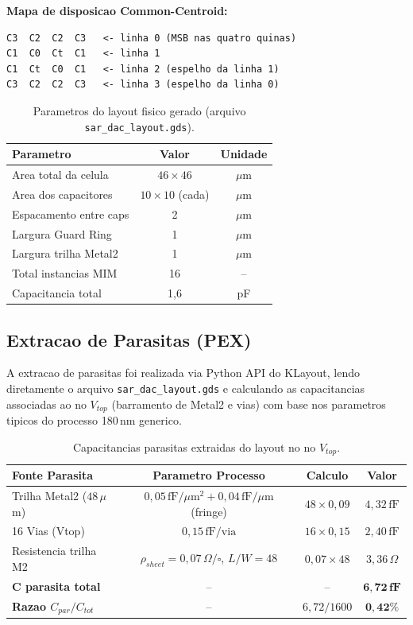 \documentclass[12pt, a4paper]{article}
\begin{document}
\textbf{Mapa de disposicao Common-Centroid:}
\begin{lstlisting}
C3  C2  C2  C3   <- linha 0 (MSB nas quatro quinas)
C1  C0  Ct  C1   <- linha 1
C1  Ct  C0  C1   <- linha 2 (espelho da linha 1)
C3  C2  C2  C3   <- linha 3 (espelho da linha 0)
\end{lstlisting}

\begin{table}[h!]
\centering
\caption{Parametros do layout fisico gerado (arquivo \texttt{sar\_dac\_layout.gds}).}
\label{tab:layout}
\begin{tabular}{lcc}
\toprule
\textbf{Parametro} & \textbf{Valor} & \textbf{Unidade} \\
\midrule
Area total da celula & $46 \times 46$ & $\mu$m \\
Area dos capacitores & $10 \times 10$ (cada) & $\mu$m \\
Espacamento entre caps & 2 & $\mu$m \\
Largura Guard Ring & 1 & $\mu$m \\
Largura trilha Metal2 & 1 & $\mu$m \\
Total instancias MIM & 16 & -- \\
Capacitancia total & 1{,}6 & pF \\
\bottomrule
\end{tabular}
\end{table}

\subsection{Extracao de Parasitas (PEX)}

A extracao de parasitas foi realizada via Python API do KLayout, lendo diretamente o arquivo
\texttt{sar\_dac\_layout.gds} e calculando as capacitancias associadas ao no $V_{top}$
(barramento de Metal2 e vias) com base nos parametros tipicos do processo 180\,nm generico.

\begin{table}[h!]
\centering
\caption{Capacitancias parasitas extraidas do layout no no $V_{top}$.}
\label{tab:pex}
\begin{tabular}{lccc}
\toprule
\textbf{Fonte Parasita} & \textbf{Parametro Processo} & \textbf{Calculo} & \textbf{Valor} \\
\midrule
Trilha Metal2 ($48\,\mu$m) & $0{,}05\,\text{fF}/\mu\text{m}^2 + 0{,}04\,\text{fF}/\mu$m (fringe) & $48 \times 0{,}09$ & $4{,}32\,\text{fF}$ \\
16 Vias (Vtop)            & $0{,}15\,\text{fF/via}$ & $16 \times 0{,}15$ & $2{,}40\,\text{fF}$ \\
Resistencia trilha M2     & $\rho_{sheet} = 0{,}07\,\Omega/\square$, $L/W = 48$ & $0{,}07 \times 48$ & $3{,}36\,\Omega$ \\
\midrule
\textbf{C parasita total} & -- & -- & $\mathbf{6{,}72\,\text{fF}}$ \\
\textbf{Razao $C_{par}/C_{tot}$} & -- & $6{,}72/1600$ & $\mathbf{0{,}42\%}$ \\
\bottomrule
\end{tabular}
\end{table}
\end{document}
